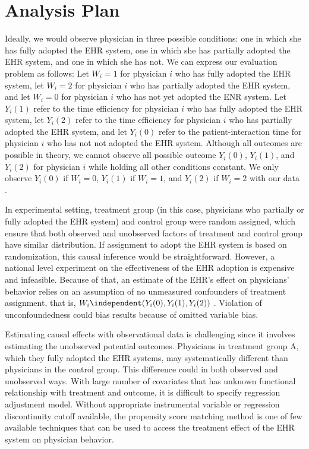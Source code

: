 \section{Analysis Plan}
Ideally, we would observe physician in three possible conditions: one in which she has fully adopted the EHR system, one in which she has partially adopted the EHR system, and one in which she has not. We can express our evaluation problem as follows: Let $W_i = 1$ for physician $i$ who has fully adopted the EHR system, let $W_i = 2$ for physician $i$ who has partially adopted the EHR system, and let $W_i = 0$ for physician $i$ who has not yet adopted the ENR system. Let $Y_i(1)$ refer to the time efficiency for physician $i$ who has fully adopted the EHR system, let $Y_i(2)$ refer to the time efficiency for physician $i$ who has partially adopted the EHR system, and let $Y_i(0)$ refer to the patient-interaction time for physician $i$ who has not not adopted the EHR system. Although all outcomes are possible in theory, we cannot observe all possible outcome $Y_i(0)$, $Y_i(1)$, and $Y_i(2)$ for physician $i$ while holding all other conditions constant. We only observe $Y_i(0)$ if $W_i = 0$, $Y_i(1)$ if $W_i = 1$, and $Y_i(2)$ if $W_i = 2$ with our data \citep{imbens2008recent}.

In experimental setting, treatment group (in this case, physicians who partially or fully adopted the EHR system) and control group were random assigned, which ensure that both observed and unobserved factors of treatment and control group have similar distribution. If assignment to adopt the EHR system is based on randomization, this causal inference would be straightforward. However, a national level experiment on the effectiveness of the EHR adoption is expensive and infeasible. Because of that, an estimate of the EHR's effect on physicians' behavior relies on an assumption of no unmeasured confounders of treatment assignment, that is, $W_i \independent (Y_i(0),Y_i(1),Y_i(2))$ \citep{imbens2008recent}. Violation of unconfoundedness could bias results because of omitted variable bias.



Estimating causal effects with observational data is challenging since it involves estimating the unobserved potential outcomes. Physicians in treatment group A, which they fully adopted the EHR systems, may systematically different than physicians in the control group. This difference could in both observed and unobserved ways. With large number of covariates that has unknown functional relationship with treatment and outcome, it is difficult to specify regression adjustment model. Without appropriate instrumental variable or regression discontinuity cutoff available, the propensity score matching method is one of few available techniques that can be used to access the treatment effect of the EHR system on physician behavior.


